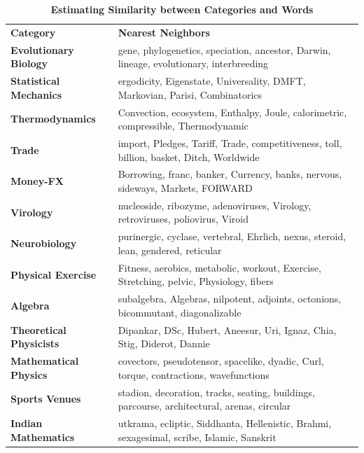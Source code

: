 \begin{table}[h!]
\tabcolsep=1mm
\footnotesize
\begin{center}
\begin{adjustwidth}{-1.5cm}{}
\begin{tabular}{l@{\hskip3mm} l}
\toprule
\multirow{2}{*}{\textbf{Category}} & \multirow{2}{*}{\textbf{Nearest Neighbors}} \\
 & \\
\textbf{Evolutionary Biology}   & gene, phylogenetics, speciation, ancestor, Darwin, lineage, evolutionary, interbreeding \\
\textbf{Statistical Mechanics}  & ergodicity, Eigenstate, Universality, DMFT, Markovian, Parisi, Combinatorics \\
\textbf{Thermodynamics}         & Convection, ecosystem, Enthalpy, Joule, calorimetric, compressible, Thermodynamic \\
\textbf{Trade}                  & import, Pledges, Tariff, Trade, competitiveness, toll, billion, basket, Ditch, Worldwide \\
\textbf{Money-FX}               & Borrowing, franc, banker, Currency, banks, nervous, sideways, Markets, FORWARD \\
\textbf{Virology}               & nucleoside, ribozyme, adenoviruses, Virology, retroviruses, poliovirus, Viroid \\
\textbf{Neurobiology}           & purinergic, cyclase, vertebral, Ehrlich, nexus, steroid, lean, gendered, reticular \\
\textbf{Physical Exercise}      & Fitness, aerobics, metabolic, workout, Exercise, Stretching, pelvic, Physiology, fibers \\
\textbf{Algebra}                & subalgebra, Algebras, nilpotent, adjoints, octonions, bicommutant, diagonalizable \\
\textbf{Theoretical Physicists} & Dipankar, DSc, Hubert, Aneesur, Uri, Ignaz, Chia, Stig, Diderot, Dannie \\
\textbf{Mathematical Physics}   & covectors, pseudotensor, spacelike, dyadic, Curl, torque, contractions, wavefunctions \\
\textbf{Sports Venues}          & stadion, decoration, tracks, seating, buildings, parcourse, architectural, arenas, circular \\
\textbf{Indian Mathematics}     & utkrama, ecliptic, Siddhanta, Hellenistic, Brahmi, sexagesimal, scribe, Islamic, Sanskrit \\
\bottomrule         
\end{tabular}
 \end{adjustwidth}
\end{center}
\caption{\label{catword:sim} \footnotesize \textbf{Estimating Similarity between Categories and Words}}
\end{table}